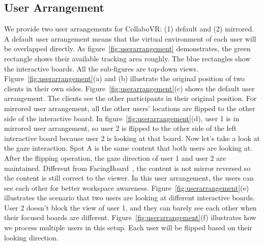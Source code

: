 \documentclass{sigchi}
\begin{document}
\subsection{User Arrangement}
We provide two user arrangements for CollaboVR: (1) default and (2) mirrored. A default user arrangement means that the virtual environment of each user will be overlapped directly. As figure~\ref{fig:userarrangement} demonstrates, the green rectangle shows their available tracking area roughly. The blue rectangles show the interactive boards. All the sub-figures are top-down views. Figure~\ref{fig:userarrangement}(a) and (b) illustrate the original position of two clients in their own sides. Figure~\ref{fig:userarrangement}(c) shows the default user arrangement. The clients see the other participants in their original position. For mirrored user arrangement, all the other users' locations are flipped to the other side of the interactive board. In figure~\ref{fig:userarrangement}(d), user 1 is in mirrored user arrangement, so user 2 is flipped to the other side of the left interactive board because user 2 is looking at that board. Now let's take a look at the gaze interaction. Spot A is the same content that both users are looking at. After the flipping operation, the gaze direction of user 1 and user 2 are maintained. Different from FacingBoard~\cite{li2014interactive}, the content is not mirror reversed so the content is still correct to the viewer. In this user arrangement, the users can see each other for better workspace awareness. Figure~\ref{fig:userarrangement}(e) illustrates the scenario that two users are looking at different interactive boards. User 2 doesn't block the view of user 1, and they can barely see each other when their focused boards are different. Figure~\ref{fig:userarrangement}(f) illustrates how we process multiple users in this setup. Each user will be flipped based on their looking direction.
\end{document}
